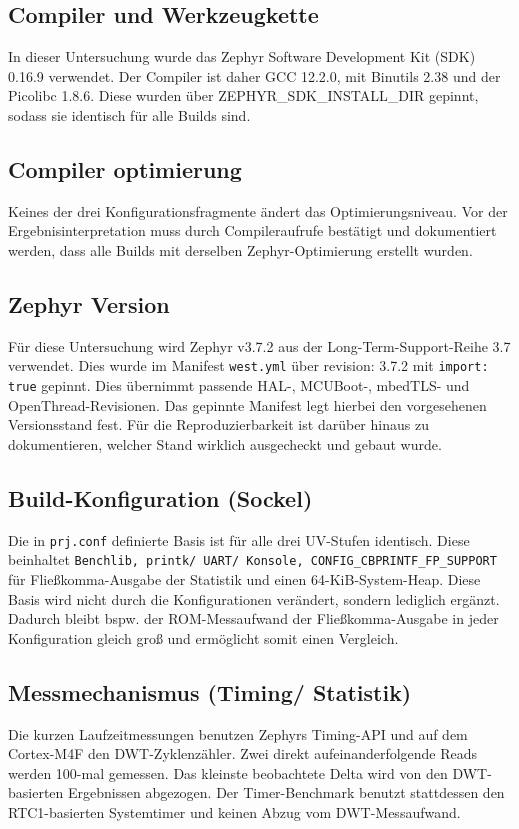 \subsection{Compiler und Werkzeugkette}
In dieser Untersuchung wurde das Zephyr Software Development Kit (SDK) 0.16.9 verwendet. Der Compiler ist daher GCC 12.2.0, mit Binutils 2.38 und der Picolibc 1.8.6. Diese wurden {\"u}ber ZEPHYR\_SDK\_INSTALL\_DIR gepinnt, sodass sie identisch f{\"u}r alle Builds sind.

\subsection{Compiler optimierung}
Keines der drei Konfigurationsfragmente {\"a}ndert das Optimierungsniveau. Vor der Ergebnisinterpretation muss durch Compileraufrufe best{\"a}tigt und dokumentiert werden, dass alle Builds mit derselben Zephyr-Optimierung erstellt wurden.

\subsection{Zephyr Version}
F{\"u}r diese Untersuchung wird Zephyr v3.7.2 aus der Long-Term-Support-Reihe 3.7 verwendet. Dies wurde im Manifest \lstinline[style=fileinline]|west.yml| {\"u}ber revision: 3.7.2 mit \lstinline[style=fileinline]|import: true| gepinnt. Dies {\"u}bernimmt passende HAL-, MCUBoot-, mbedTLS- und OpenThread-Revisionen. Das gepinnte Manifest legt hierbei den vorgesehenen Versionsstand fest. F{\"u}r die Reproduzierbarkeit ist dar{\"u}ber hinaus zu dokumentieren, welcher Stand wirklich ausgecheckt und gebaut wurde.

\subsection{Build-Konfiguration (Sockel)}
Die in \lstinline[style=fileinline]|prj.conf| definierte Basis ist f{\"u}r alle drei UV-Stufen identisch. Diese beinhaltet \lstinline[style=fileinline]|Benchlib, printk/ UART/ Konsole, CONFIG_CBPRINTF_FP_SUPPORT| f{\"u}r Flie{\ss}komma-Ausgabe der Statistik und einen 64-KiB-System-Heap. Diese Basis wird nicht durch die Konfigurationen ver{\"a}ndert, sondern lediglich erg{\"a}nzt. Dadurch bleibt bspw. der ROM-Messaufwand der Flie{\ss}komma-Ausgabe in jeder Konfiguration gleich gro{\ss} und erm{\"o}glicht somit einen Vergleich.

\subsection{Messmechanismus (Timing/ Statistik)}
Die kurzen Laufzeitmessungen benutzen Zephyrs Timing-API und auf dem Cortex-M4F den DWT-Zyklenz{\"a}hler. Zwei direkt aufeinanderfolgende Reads werden 100-mal gemessen. Das kleinste beobachtete Delta wird von den DWT-basierten Ergebnissen abgezogen. Der Timer-Benchmark benutzt stattdessen den RTC1-basierten Systemtimer und keinen Abzug vom DWT-Messaufwand.

